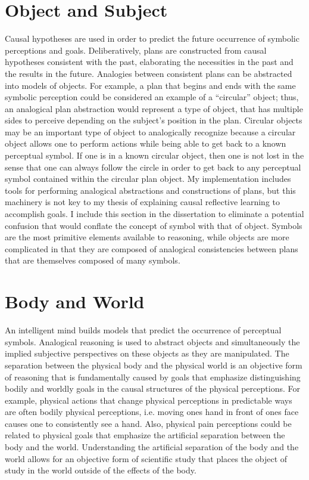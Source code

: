 \section{Object and Subject}

Causal hypotheses are used in order to predict the future occurrence
of symbolic perceptions and goals.  Deliberatively, plans are
constructed from causal hypotheses consistent with the past,
elaborating the necessities in the past and the results in the future.
Analogies between consistent plans can be abstracted into models of
objects.  For example, a plan that begins and ends with the same
symbolic perception could be considered an example of a ``circular''
object; thus, an analogical plan abstraction would represent a type of
object, that has multiple sides to perceive depending on the subject's
position in the plan.  Circular objects may be an important type of
object to analogically recognize because a circular object allows one
to perform actions while being able to get back to a known perceptual
symbol.  If one is in a known circular object, then one is not lost in
the sense that one can always follow the circle in order to get back
to any perceptual symbol contained within the circular plan object.
My implementation includes tools for performing analogical
abstractions and constructions of plans, but this machinery is not key
to my thesis of explaining causal reflective learning to accomplish
goals.  I include this section in the dissertation to eliminate a
potential confusion that would conflate the concept of symbol with
that of object.  Symbols are the most primitive elements available to
reasoning, while objects are more complicated in that they are
composed of analogical consistencies between plans that are themselves
composed of many symbols.

\section{Body and World}

An intelligent mind builds models that predict the occurrence of
perceptual symbols.  Analogical reasoning is used to abstract objects
and simultaneously the implied subjective perspectives on these
objects as they are manipulated.  The separation between the physical
body and the physical world is an objective form of reasoning that is
fundamentally caused by goals that emphasize distinguishing bodily and
worldly goals in the causal structures of the physical perceptions.
For example, physical actions that change physical perceptions in
predictable ways are often bodily physical perceptions, i.e. moving
ones hand in front of ones face causes one to consistently see a hand.
Also, physical pain perceptions could be related to physical goals
that emphasize the artificial separation between the body and the
world.  Understanding the artificial separation of the body and the
world allows for an objective form of scientific study that places the
object of study in the world outside of the effects of the body.

